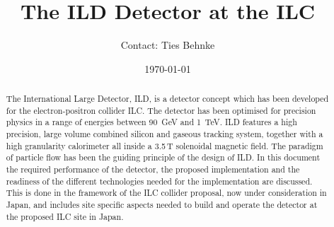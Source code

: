 \documentclass[%
 amsmath,amssymb,
 aps,
 longbibliography,
]{revtex4-1}
\begin{document}


\title{The ILD Detector at the ILC}%

\author{Contact: Ties Behnke}




\date{\today}%

\begin{abstract}
The International Large Detector, ILD, is a detector concept which has been developed for the electron-positron collider ILC. The detector has been optimised for precision physics in a range of energies between 90~GeV and 1~TeV. ILD features a high precision, large volume combined silicon and gaseous tracking system, together with a high granularity calorimeter all inside a 3.5\,T solenoidal magnetic field. The paradigm of particle flow has been the  guiding principle of the design of ILD. In this document the required performance of the detector, the proposed implementation and the readiness of the different technologies needed for the implementation are discussed. This is done in the framework of the ILC collider proposal, now under consideration in Japan, and includes site specific aspects needed to build and operate the detector at the proposed ILC site in Japan.


\end{abstract}
\end{document}
